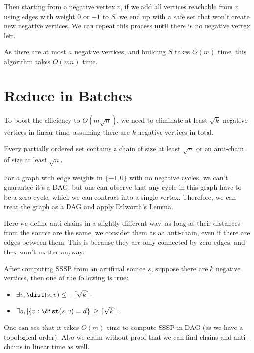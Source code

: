 Then starting from a negative vertex $v$, if we add all vertices reachable from $v$ using edges with weight $0$ or $-1$ to $S$, we end up with a safe set that won't create new negative vertices. We can repeat this process until there is no negative vertex left.

As there are at most $n$ negative vertices, and building $S$ takes $O(m)$ time, this algorithm takes $O(mn)$ time.

\section{Reduce in Batches}

To boost the efficiency to $O(m\sqrt{n})$, we need to eliminate at least $\sqrt{k}$ negative vertices in linear time, assuming there are $k$ negative vertices in total.

\begin{lemma}
	Every partially ordered set contains a chain of size at least $\sqrt{n}$ or an anti-chain of size at least $\sqrt{n}$.
\end{lemma}

For a graph with edge weights in $\{-1, 0\}$ with no negative cycles, we can't guarantee it's a DAG, but one can observe that any cycle in this graph have to be a zero cycle, which we can contract into a single vertex. Therefore, we can treat the graph as a DAG and apply Dilworth's Lemma.

\begin{remark}
	Here we define anti-chains in a slightly different way: as long as their distances from the source are the same, we consider them as an anti-chain, even if there are edges between them. This is because they are only connected by zero edges, and they won't matter anyway.
\end{remark}

\begin{corollary}
	After computing SSSP from an artificial source $s$, suppose there are $k$ negative vertices, then one of the following is true:
	\begin{itemize}
		\item $\exists v, \dist(s,v)\le -\lceil \sqrt{k}\rceil$.
		\item $\exists d, |\{v:\dist(s,v) = d\}|\ge \lceil \sqrt{k}\rceil$.
	\end{itemize}
\end{corollary}

\begin{note}
	One can see that it takes $O(m)$ time to compute SSSP in DAG (as we have a topological order). Also we claim without proof that we can find chains and anti-chains in linear time as well.
\end{note}

